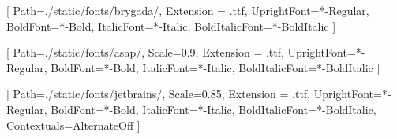 \usepackage{microtype}
\usepackage{fontspec}

[
    Path=./static/fonts/brygada/,
    Extension = .ttf,
    UprightFont=*-Regular,
    BoldFont=*-Bold,
    ItalicFont=*-Italic,
    BoldItalicFont=*-BoldItalic
    ]


\setsansfont{Asap}[
    Path=./static/fonts/asap/,
    Scale=0.9,
    Extension = .ttf,
    UprightFont=*-Regular,
    BoldFont=*-Bold,
    ItalicFont=*-Italic,
    BoldItalicFont=*-BoldItalic
    ]

\setmonofont{JetBrainsMono}[
    Path=./static/fonts/jetbrains/,
    Scale=0.85,
    Extension = .ttf,
    UprightFont=*-Regular,
    BoldFont=*-Bold,
    ItalicFont=*-Italic,
    BoldItalicFont=*-BoldItalic,
    Contextuals=AlternateOff
    ]
    
\renewcommand{\familydefault}{\sfdefault}

\newcommand{\CC}{C\nolinebreak[4]\hspace{-.1em}\sbox0{$1$}\sbox2{\small++}\raise\dimexpr(\ht0-\ht2)/2\relax\box2\hspace{.1em}}